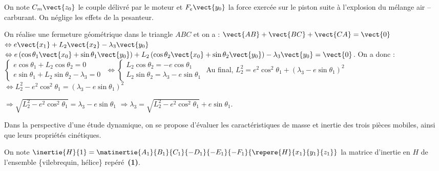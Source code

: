 On note $C_m \vect{z_0}$ le couple délivré par le moteur et $F_e \vect{y_0}$ la force exercée sur le piston suite à l'explosion du mélange air -- carburant. On néglige les effets de la pesanteur.
\fi


\ifprof
\begin{corrige}
On réalise une fermeture géométrique dans le triangle $ABC$ et on a : 
$\vect{AB}+\vect{BC}+\vect{CA}=\vect{0}$ $\Leftrightarrow e\vect{x_1}+L_2\vect{x_2}-\lambda_3 \vect{y_0}$ $\Leftrightarrow e\left( \cos \theta_1 \vect{x_0}+\sin \theta_1 \vect{y_0} \right)+L_2\left( \cos \theta_2 \vect{x_0}+\sin \theta_2 \vect{y_0} \right)-\lambda_3 \vect{y_0} = \vect{0}$. 
On a donc : 
$\left\{
\begin{array}{l}
e\cos \theta_1 +L_2 \cos \theta_2 = 0 \\
e\sin \theta_1 + L_2 \sin \theta_2 -\lambda_3 = 0
\end{array}
\right.$
$\Leftrightarrow \left\{
\begin{array}{l}
L_2 \cos \theta_2 = -e\cos \theta_1  \\
L_2 \sin \theta_2  = \lambda_3-e\sin \theta_1
\end{array}
\right.
$
Au final, $L_2^2 = e^2\cos^2 \theta_1 + \left(\lambda_3-e\sin \theta_1\right)^2$
$\Leftrightarrow L_2^2 - e^2\cos^2 \theta_1 = \left(\lambda_3-e\sin \theta_1\right)^2$

$\Rightarrow \sqrt{L_2^2 - e^2\cos^2 \theta_1} = \lambda_3-e\sin \theta_1$
$ \Rightarrow \lambda_3 = \sqrt{L_2^2 - e^2\cos^2 \theta_1}+e\sin \theta_1$.

\end{corrige}
\else
\fi

\ifprof

\else
Dans la perspective d’une étude dynamique, on se propose d’évaluer les caractéristiques de masse et inertie des trois pièces mobiles, ainsi que leurs propriétés cinétiques.

On note $\inertie{H}{1}=\matinertie{A_1}{B_1}{C_1}{-D_1}{-E_1}{-F_1}{\repere{H}{x_1}{y_1}{z_1}}$ la matrice d'inertie en $H$ de l'ensemble \{vilebrequin, hélice\} repéré~\textbf{(1)}. 
\fi


